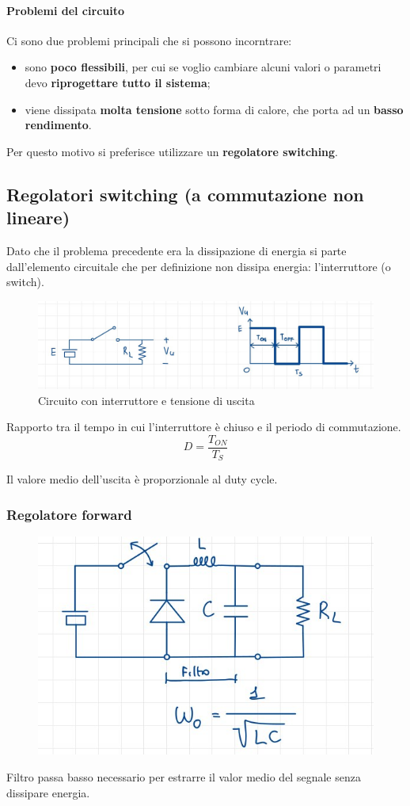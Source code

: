 \documentclass[11pt,a4paper,]{article}
\begin{document}
\paragraph{Problemi del circuito}
Ci sono due problemi principali che si possono incorntrare:
\begin{itemize}
    \item sono \textbf{poco flessibili}, per cui se voglio cambiare alcuni valori o parametri devo \textbf{riprogettare tutto il sistema};
    \item viene dissipata \textbf{molta tensione} sotto forma di calore, che porta ad un \textbf{basso rendimento}.
\end{itemize}
\noindent Per questo motivo si preferisce utilizzare un \textbf{regolatore switching}.
\subsection{Regolatori switching (a commutazione non lineare)}
Dato che il problema precedente era la dissipazione di energia si parte dall’elemento circuitale che per definizione non dissipa energia: l’interruttore (o switch).
\begin{figure}[H]
    \centering
    \includegraphics[width=0.5\linewidth]{img/reg switch.png}
    \caption{Circuito con interruttore e tensione di uscita}
\end{figure}
\begin{definizione}
    Rapporto tra il tempo in cui l'interruttore è chiuso e il periodo di commutazione.
    \[
    D=\frac{T_{ON}}{T_S}
    \]
\end{definizione}
Il valore medio dell'uscita è proporzionale al duty cycle.
\subsubsection{Regolatore forward}
\begin{figure}[H]
    \centering
    \includegraphics[width=0.5\linewidth]{img/reg fw.png}
\end{figure}
\begin{nota}
    Filtro passa basso necessario per estrarre il valor medio del segnale senza dissipare energia.
\end{nota}
\end{document}
